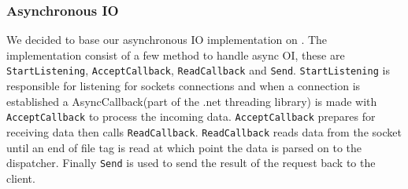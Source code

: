 \subsubsection{Asynchronous IO}
\label{sec:asyncImplementation}
We decided to base our asynchronous IO implementation on \cite{asynh-imlp}. The implementation consist of a few method to handle async OI, these are \texttt{StartListening}, \texttt{AcceptCallback}, \texttt{ReadCallback} and \texttt{Send}. \texttt{StartListening} is responsible for listening for sockets connections and when a connection is established a AsyncCallback(part of the .net threading library) is made with \texttt{AcceptCallback} to process the incoming data. \texttt{AcceptCallback} prepares for receiving data then calls \texttt{ReadCallback}. \texttt{ReadCallback} reads data from the socket until an end of file tag is read at which point the data is parsed on to the dispatcher. Finally \texttt{Send} is used to send the result of the request back to the client.  %